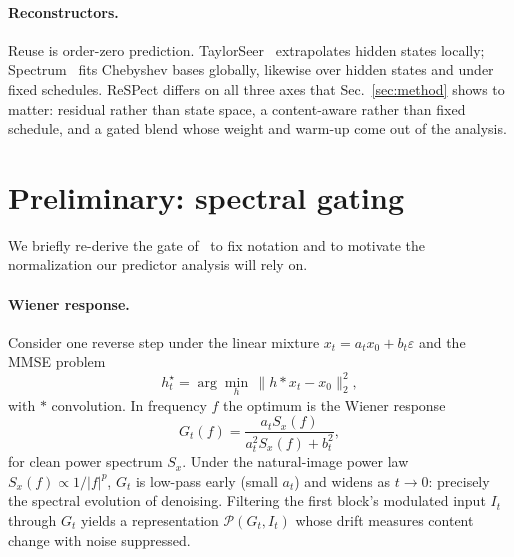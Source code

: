 \documentclass[10pt,twocolumn,letterpaper]{article}
\begin{document}
\paragraph{Reconstructors.}
Reuse is order-zero prediction. TaylorSeer~\cite{taylorseer} extrapolates
hidden states locally; Spectrum~\cite{spectrum} fits Chebyshev bases
globally, likewise over hidden states and under fixed schedules.
ReSPect differs on all three axes that Sec.~\ref{sec:method} shows to
matter: residual rather than state space, a content-aware rather than
fixed schedule, and a gated blend whose weight and warm-up come out of
the analysis.

\section{Preliminary: spectral gating}
\label{sec:gate}

We briefly re-derive the gate of~\cite{seacache} to fix notation and to
motivate the normalization our predictor analysis will rely on.

\paragraph{Wiener response.}
Consider one reverse step under the linear mixture
$x_t = a_t x_0 + b_t \varepsilon$ and the MMSE problem
\begin{equation}
  h_t^\star = \arg\min_h\, \|h \ast x_t - x_0\|_2^2,
  \label{eq:mmse}
\end{equation}
with $\ast$ convolution. In frequency $f$ the optimum is the Wiener
response
\begin{equation}
  G_t(f) = \frac{a_t S_x(f)}{a_t^2 S_x(f) + b_t^2},
  \label{eq:wiener}
\end{equation}
for clean power spectrum $S_x$. Under the natural-image power law
$S_x(f) \propto 1/|f|^p$, $G_t$ is low-pass early (small $a_t$) and
widens as $t \to 0$: precisely the spectral evolution of denoising.
Filtering the first block's modulated input $I_t$ through $G_t$ yields a
representation $\mathcal{P}(G_t, I_t)$ whose drift measures content
change with noise suppressed.
\end{document}
